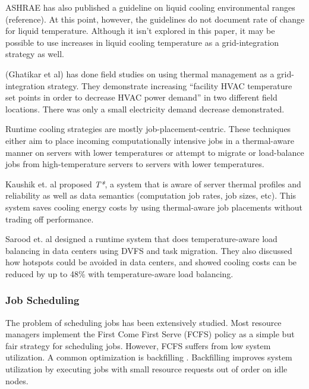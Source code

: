 ASHRAE has also published a guideline on liquid cooling environmental ranges
(reference).  At this point, however, the guidelines do not document rate of
change for liquid temperature.  Although it isn’t explored in this paper, it
may be possible to use increases in liquid cooling temperature as a
grid-integration strategy as well. 

(Ghatikar et al\cite{Ghatikar2012a}) has done field studies on using thermal
management as a grid-integration strategy.  They demonstrate increasing
“facility HVAC temperature set points in order to decrease HVAC power
demand” in two different field locations.  There was only a small
electricity demand decrease demonstrated.


Runtime cooling strategies are mostly job-placement-centric. These techniques
either aim to place incoming computationally intensive jobs in a thermal-aware
manner on servers with lower temperatures or attempt to migrate or load-balance
jobs from high-temperature servers to servers with lower temperatures.

Kaushik et. al \cite{kaushik_t*:_2012} proposed \emph{T*}, a system that is
aware of server thermal profiles and reliability as well as data semantics
(computation job rates, job sizes, etc). This system saves cooling energy costs
by using thermal-aware job placements without trading off performance.

Sarood et. al \cite{SaroodSC11} designed a runtime system that does
temperature-aware load balancing in data centers using DVFS and task migration.
They also discussed how hotspots could be avoided in data centers, and showed
cooling costs can be reduced by up to 48\% with temperature-aware load
balancing.

\subsubsection{Job Scheduling}
The problem of scheduling jobs has been extensively studied. Most resource
managers implement the First Come First Serve (FCFS) policy as a simple but fair
strategy for scheduling jobs. However, FCFS suffers from low system utilization.
A common optimization is backfilling
\cite{lifka_anl/ibm_1995,mualem_utilization_2001,feitelson_parallel_2004}.
Backfilling improves system utilization by executing jobs with small resource
requests out of order on idle nodes.

